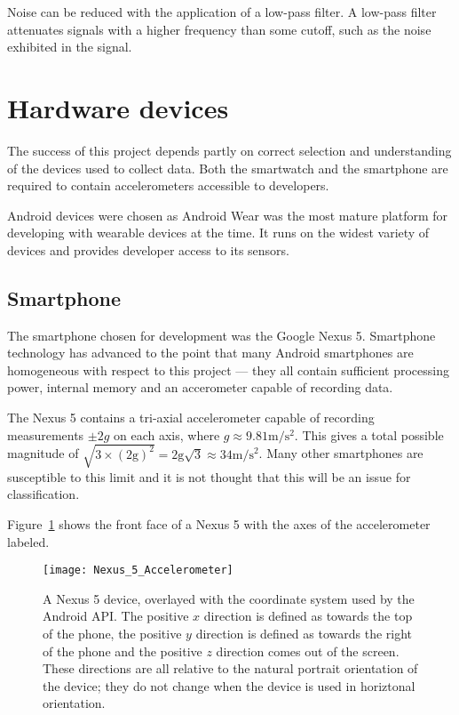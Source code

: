       
      Noise can be reduced with the application of a low-pass filter. A low-pass filter attenuates signals with a higher frequency than some cutoff, such as the noise exhibited in the signal.
      
  
  \section{Hardware devices}
    The success of this project depends partly on correct selection and understanding of the devices
    used to collect data. Both the smartwatch and the smartphone are required to contain accelerometers accessible to
    developers.
    
    Android devices were chosen as Android Wear was the most mature platform for developing with
    wearable devices at the time. It runs on the widest variety of devices and provides developer 
    access to its sensors.
    
    \subsection{Smartphone}
      The smartphone chosen for development was the Google Nexus 5. Smartphone technology has
      advanced to the point that many Android smartphones are homogeneous with respect to this
      project --- they all contain sufficient processing power, internal memory and an 
      accerometer capable of recording data.
      
      The Nexus 5 contains a tri-axial accelerometer capable of recording measurements $\pm2\si{g}$
      on each axis, where $\si{g} \approx 9.81\si{\metre\per\square\second}$. This gives a total possible magnitude of $\sqrt{3 \times (2\mathrm{g})^2} = 2\mathrm{g}\sqrt{3} \approx 34 \si{\metre\per\square\second}$. Many other smartphones are susceptible to this limit and it is not thought that this will be an issue for classification.
      
      Figure~\ref{fig:nexus-5-accelerometer} shows the front face of a Nexus 5 with the axes of the
      accelerometer labeled.
      
      \begin{figure}[!th]
        \centering
        \texttt{[image: Nexus\_5\_Accelerometer]}
        \caption{A Nexus 5 device, overlayed with the coordinate system used by the Android API. The positive $x$ direction is defined as towards the top of the phone, the positive $y$ direction is defined as towards the right of the phone and the positive $z$ direction comes out of the screen. These directions are all relative to the natural portrait orientation of the device; they do not change when the device is used in horiztonal orientation.}
        \label{fig:nexus-5-accelerometer}
      \end{figure}
      
